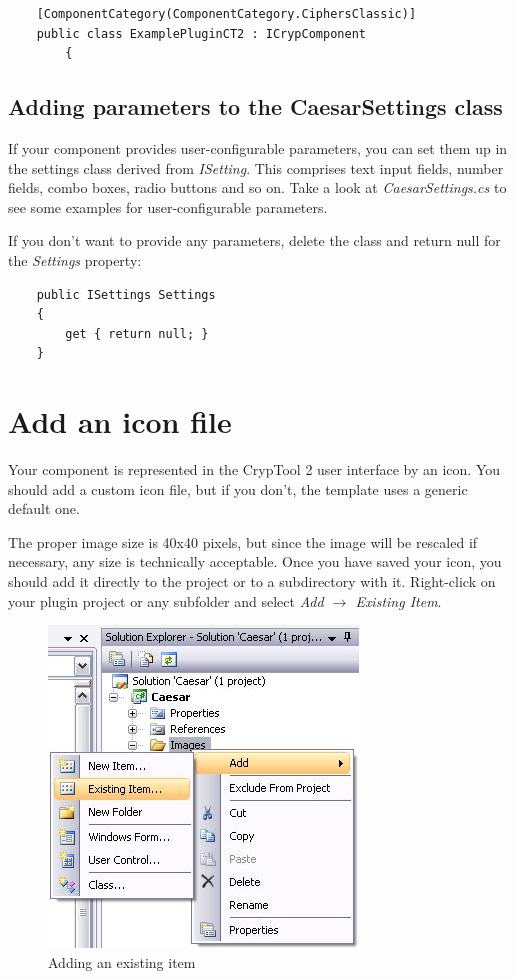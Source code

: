 \begin{lstlisting}
    [ComponentCategory(ComponentCategory.CiphersClassic)]
    public class ExamplePluginCT2 : ICrypComponent
		{
\end{lstlisting}

\subsection{Adding parameters to the CaesarSettings class}
\label{sec:AddingControlsToTheCaesarSettingsClass}

If your component provides user-configurable parameters, you can set them up in the settings class derived from \textit{ISetting}. This comprises text input fields, number fields, combo boxes, radio buttons and so on. Take a look at \textit{CaesarSettings.cs} to see some examples for user-configurable parameters.

If you don't want to provide any parameters, delete the class and return null for the \textit{Settings} property:

\begin{lstlisting}
	public ISettings Settings
	{
		get { return null; }
	}
\end{lstlisting}

\section{Add an icon file}
\label{sec:AddingAnIconToTheCaesarClass}

Your component is represented in the CrypTool 2 user interface by an icon. You should add a custom icon file, but if you don't, the template uses a generic default one.

The proper image size is 40x40 pixels, but since the image will be rescaled if necessary, any size is technically acceptable. Once you have saved your icon, you should add it directly to the project or to a subdirectory with it. Right-click on your plugin project or any subfolder and select \textit{Add $\rightarrow$ Existing Item}.

\begin{figure}[h!]
	\centering
		\includegraphics{figures/add_existing_item.jpg}
	\caption{Adding an existing item}
	\label{fig:add_existing_item}
\end{figure}
\clearpage


